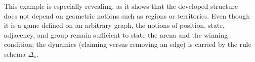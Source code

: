 This example is especially revealing, as it shows that the developed structure does not depend on geometric notions such as regions or territories. Even though it is a game defined on an arbitrary graph, the notions of position, state, adjacency, and group remain sufficient to state the arena and the winning condition; the dynamics (claiming versus removing an edge) is carried by the rule schema $\Delta_s$.
